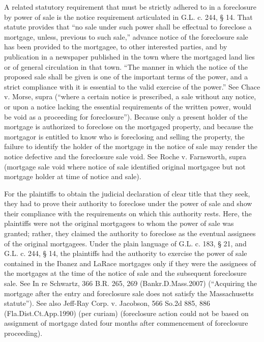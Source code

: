 A related statutory requirement that must be strictly adhered to in a
foreclosure by power of sale is the notice requirement articulated in G.L. c.
244, {\S} 14. That statute provides that ``no sale under such power shall be
effectual to foreclose a mortgage, unless, previous to such sale,'' advance
notice of the foreclosure sale has been provided to the mortgagee, to other
interested parties, and by publication in a newspaper published in the town
where the mortgaged land lies or of general circulation in that town. ``The
manner in which the notice of the proposed sale shall be given is one of the
important terms of the power, and a strict compliance with it is essential to
the valid exercise of the power.'' See Chace v. Morse, supra (``where a certain
notice is prescribed, a sale without any notice, or upon a notice lacking the
essential requirements of the written power, would be void as a proceeding for
foreclosure''). Because only a present holder of the mortgage is authorized to
foreclose on the mortgaged property, and because the mortgagor is entitled to
know who is foreclosing and selling the property, the failure to identify the
holder of the mortgage in the notice of sale may render the notice defective
and the foreclosure sale void. See Roche v. Farnsworth, supra (mortgage sale
void where notice of sale identified original mortgagee but not mortgage holder
at time of notice and sale). 

For the plaintiffs to obtain the judicial declaration of clear title that they
seek, they had to prove their authority to foreclose under the power of sale
and show their compliance with the requirements on which this authority rests.
Here, the plaintiffs were not the original mortgagees to whom the power of sale
was granted; rather, they claimed the authority to foreclose as the eventual
assignees of the original mortgagees. Under the plain language of G.L. c. 183,
{\S} 21, and G.L. c. 244, {\S} 14, the plaintiffs had the authority to exercise
the power of sale contained in the Ibanez and LaRace mortgages only if they
were the assignees of the mortgages at the time of the notice of sale and the
subsequent foreclosure sale. See In re Schwartz, 366 B.R. 265, 269
(Bankr.D.Mass.2007) (``Acquiring the mortgage after the entry and foreclosure
sale does not satisfy the Massachusetts statute''). See also Jeff-Ray Corp. v.
Jacobson, 566 So.2d 885, 886 (Fla.Dist.Ct.App.1990) (per curiam) (foreclosure
action could not be based on assignment of mortgage dated four months after
commencement of foreclosure proceeding).

